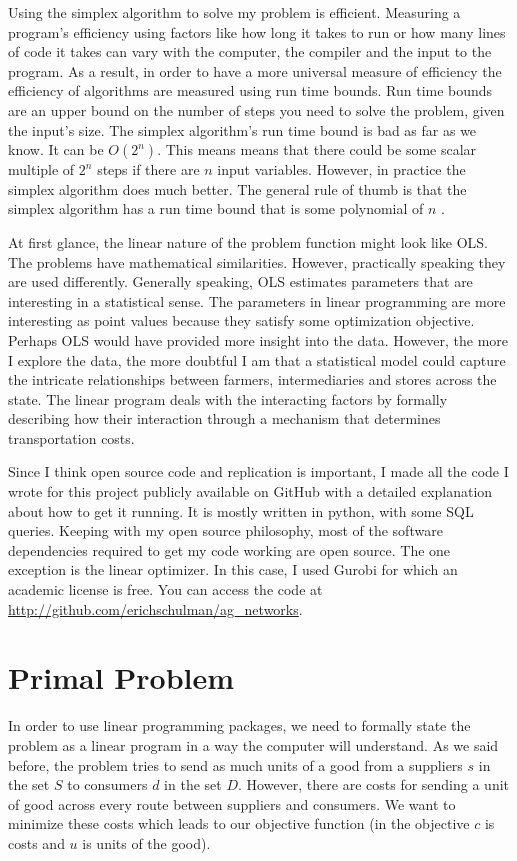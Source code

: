 \documentclass{report}
\begin{document}
Using the simplex algorithm to solve my problem is efficient. Measuring a program's efficiency using factors like how long it takes to run or how many lines of code it takes can vary with the computer, the compiler and the input to the program. As a result, in order to have a more universal measure of efficiency the efficiency of algorithms are measured using run time bounds. Run time bounds are an upper bound on the number of steps you need to solve the problem, given the input's size.  The simplex algorithm's run time bound is bad as far as we know. It can be $O(2^n)$. This means means that there could be some scalar multiple of $2^n$ steps if there are $n$ input variables. However, in practice the simplex algorithm does much better. The general rule of thumb is that the simplex algorithm has a run time bound that is some polynomial of $n$ \cite{Cook}.

At first glance, the  linear nature of the problem function might look like OLS. The problems have mathematical similarities. However, practically speaking they are used differently. Generally speaking, OLS estimates parameters that are interesting in a statistical sense.  The parameters in linear programming are more interesting as point values because they satisfy some optimization objective. Perhaps OLS would have provided more insight into the data. However, the more I explore the data, the more doubtful I am that a statistical model could capture the intricate relationships between farmers, intermediaries and stores across the state. The linear program deals with the interacting factors by formally describing how their interaction through a mechanism that determines transportation costs.

Since I think open source code and replication is important, I made all the code I wrote for this project publicly available on GitHub with a detailed explanation about how to get it running. It is mostly written in python, with some SQL queries. Keeping with my open source philosophy, most of the software dependencies required to get my code working are open source. The one exception is the linear optimizer. In this case, I used Gurobi for which an academic license is free. You can access the code at \url{http://github.com/erichschulman/ag_networks}.

\section{Primal Problem}

In order to use linear programming packages, we need to formally state the problem as a linear program in a way the computer will understand. As we said before, the problem tries to send as much units of a good from a suppliers $s$ in the set $S$ to consumers $d$ in the set $D$. However, there are costs for sending a unit of good across every route between suppliers and consumers. We want to minimize these costs which leads to our objective function (in the objective $c$ is costs and $u$ is units of the good). 
\end{document}
